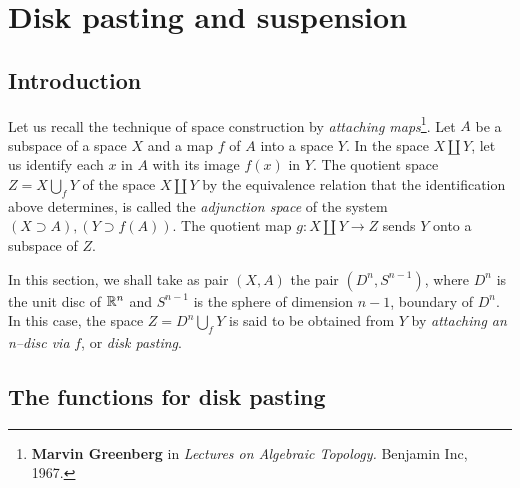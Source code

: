 \chapter {Disk pasting and suspension}

\section{Introduction}

Let us recall the technique of space construction by
{\em attaching maps}\footnote {{\bf Marvin Greenberg} in
{\em Lectures on Algebraic Topology.} Benjamin Inc, 1967.}. Let $A$ be a subspace of a space $X$ and a map
$f$ of $A$ into a space $Y$. In the space $X \coprod Y$, let us identify each $x$ in $A$ with its image
$f(x)$ in $Y$. The quotient space $Z=X\bigcup_f Y$ of the space $X\coprod Y$ by the equivalence
relation that the identification above determines, is called the {\em adjunction space} of the system
$(X \supset A), (Y\supset f(A))$. The quotient map $g: X\coprod Y \rightarrow Z$ sends $Y$
onto a subspace of $Z$.
\par
In this section, we shall take as pair $(X,A)$ the pair $(D^n, S^{n-1})$, where $D^n$ is the
unit disc of ${{\mathbb{R}}}^n$ and  $S^{n-1}$ is the sphere of dimension ${n-1}$, boundary of $D^n$. In this case,
the space $Z=D^n\bigcup_f Y$ is said to be obtained from $Y$ by {\em attaching an n--disc via} $f$, or
{\em disk pasting}.

\section{The functions for  disk pasting}

